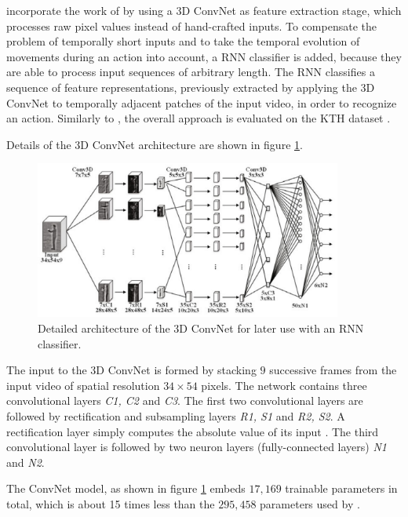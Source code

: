 \textcite{baccouche_sequential_2011} incorporate the work of \textcite{ji_3d_2013} by using a 3D ConvNet as feature extraction stage, which processes raw pixel values instead of hand-crafted inputs.
To compensate the problem of temporally short inputs and to take the temporal evolution of movements during an action into account, a RNN classifier is added, because they are able to process input sequences of arbitrary length.
The RNN classifies a sequence of feature representations, previously extracted by applying the 3D ConvNet to temporally adjacent patches of the input video, in order to recognize an action. 
Similarly to \cite{ji_3d_2013}, the overall approach is evaluated on the KTH dataset \cite{schuldt_recognizing_2004}.

Details of the 3D ConvNet architecture are shown in figure \ref{fig:sequentialdeep_cnnarchitecture}.
\begin{figure}[H]
    \centering
    \includegraphics[width=0.9\textwidth]{img_deep/sequentialdeep_cnnarchitecture}
    \caption{Detailed architecture of the 3D ConvNet for later use with an RNN classifier. \cite{baccouche_sequential_2011}}
    \label{fig:sequentialdeep_cnnarchitecture}
\end{figure}

The input to the 3D ConvNet is formed by stacking $9$ successive frames from the input video of spatial resolution $34\times54$ pixels.
The network contains three convolutional layers \textit{C1, C2} and \textit{C3}.
The first two convolutional layers are followed by rectification and subsampling layers \textit{R1, S1} and \textit{R2, S2}.
A rectification layer simply computes the absolute value of its input \cite{baccouche_sequential_2011}.
The third convolutional layer is followed by two neuron layers (fully-connected layers) \textit{N1} and \textit{N2}.

The ConvNet model, as shown in figure \ref{fig:sequentialdeep_cnnarchitecture} embeds $17,169$ trainable parameters in total, which is about 15 times less than the $295,458$ parameters used by \textcite{ji_3d_2013}.

